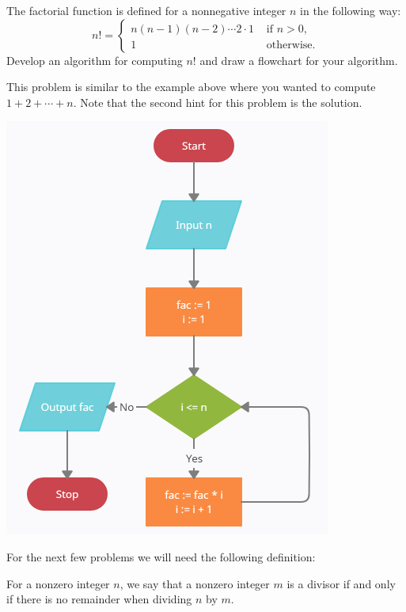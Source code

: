 \documentclass{ximera}
\begin{document}
\begin{question}
	The factorial function is defined for a nonnegative integer $n$ in the following way:
	$$n! = \begin{cases}n(n-1)(n-2)\cdots 2\cdot 1 & \text{ if $n>0$,}\\
		1 & \text{ otherwise.}
	\end{cases}$$
	Develop an algorithm for computing $n!$ and draw a flowchart for your algorithm.
	\begin{hint}
		This problem is similar to the example above where you wanted to compute $1+2+\cdots+n$. Note that the second hint for this problem is the solution.
	\end{hint}
	\begin{hint}
		\begin{center}
			\includegraphics{factorial.png}
		\end{center}
	\end{hint}
\end{question}

For the next few problems we will need the following definition:

\begin{definition}
	For a nonzero integer $n$, we say that a nonzero integer $m$ is a divisor if and only if there is no remainder when dividing $n$ by $m$.
\end{definition}
\end{document}
